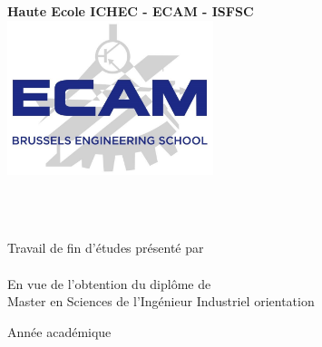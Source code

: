 \begin{titlepage}
\begin{center}



\Large \textbf{Haute Ecole ICHEC - ECAM - ISFSC}~\\[1.0cm]
\includegraphics[width=0.45\textwidth]{images/logo.jpg}\\[1cm]



\textsc{\Large }\\[2.9cm]


\fbox{
\begin{minipage}{\textwidth}
\begin{center}
    {\huge \bfseries \titre }
\end{center}
\end{minipage}}

\textsc{\Large }\\[3.5cm]

\begin{flushright}
    Travail de fin d'études présenté par\\[0.5cm]
    \prenom \: \textsc{\nom}\\[0.5cm]
    En vue de l'obtention du diplôme de\\[0.5cm]
    Master en Sciences de l'Ingénieur Industriel orientation \orientationEtude
    
    
\end{flushright}
\vfill

{\large Année académique \anneeAcad}

\end{center}
\end{titlepage}